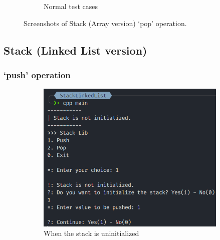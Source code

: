 \begin{figure}[!ht]
\begin{subfigure}{0.39\textwidth}
		\caption{Normal test cases}\label{fig:stack_arr_pop_normal}
	\end{subfigure}
	\caption{Screenshots of Stack (Array version) `pop' operation.}\label{fig:stack_arr_pop_cases}
\end{figure}

\pagebreak
\subsection{Stack (Linked List version)}
\subsubsection*{`push' operation}
\begin{figure}[!ht]
	\centering
	\begin{subfigure}{0.55\textwidth}
		\centering
		\includegraphics[width=\textwidth]{imgs/StackLinkedList/push/empty.png}
		\caption{When the stack is uninitialized}\label{fig:stack_ll_push_empty}
	\end{subfigure}
	\hfill
	\begin{subfigure}{0.43\textwidth}
		\centering

\end{subfigure}
\end{figure}
